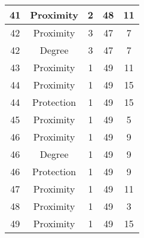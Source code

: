 \documentclass[results.tex]{subfiles}
\begin{document}
\begin{center}
\begin{tabular}{| c || c | c | c | c |}
    41 & Proximity & 2 & 48 & 11 \\ 
    \hline
    42 & Proximity & 3 & 47 & 7 \\ 
    \hline
    42 & Degree & 3 & 47 & 7 \\ 
    \hline
    43 & Proximity & 1 & 49 & 11 \\ 
    \hline
    44 & Proximity & 1 & 49 & 15 \\ 
    \hline
    44 & Protection & 1 & 49 & 15 \\ 
    \hline
    45 & Proximity & 1 & 49 & 5 \\ 
    \hline
    46 & Proximity & 1 & 49 & 9 \\ 
    \hline
    46 & Degree & 1 & 49 & 9 \\ 
    \hline
    46 & Protection & 1 & 49 & 9 \\ 
    \hline
    47 & Proximity & 1 & 49 & 11 \\ 
    \hline
    48 & Proximity & 1 & 49 & 3 \\ 
    \hline
    49 & Proximity & 1 & 49 & 15 \\ 
    \hline   \end{tabular}
\end{center}
\end{document}
